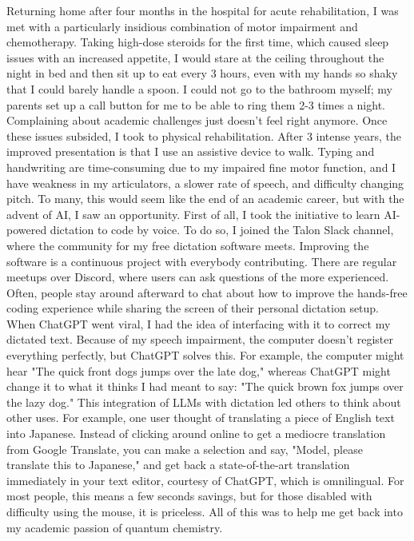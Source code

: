 \documentclass[11pt]{article} %
\begin{document}
Returning home after four months in the hospital for acute rehabilitation, I was met with a particularly insidious combination of motor impairment and chemotherapy. Taking high-dose steroids for the first time, which caused sleep issues with an increased appetite, I would stare at the ceiling throughout the night in bed and then sit up to eat every 3 hours, even with my hands so shaky that I could barely handle a spoon. I could not go to the bathroom myself; my parents set up a call button for me to be able to ring them 2-3 times a night. Complaining about academic challenges just doesn't feel right anymore. Once these issues subsided, I took to physical rehabilitation. After 3 intense years, the improved presentation is that I use an assistive device to walk. Typing and handwriting are time-consuming due to my impaired fine motor function, and I have weakness in my articulators, a slower rate of speech, and difficulty changing pitch. To many, this would seem like the end of an academic career, but with the advent of AI, I saw an opportunity. First of all, I took the initiative to learn AI-powered dictation to code by voice. To do so, I joined the Talon Slack channel, where the community for my free dictation software meets. Improving the software is a continuous project with everybody contributing. There are regular meetups over Discord, where users can ask questions of the more experienced. Often, people stay around afterward to chat about how to improve the hands-free coding experience while sharing the screen of their personal dictation setup. When ChatGPT went viral, I had the idea of interfacing with it to correct my dictated text. Because of my speech impairment, the computer doesn't register everything perfectly, but ChatGPT solves this. For example, the computer might hear "The quick front dogs jumps over the late dog," whereas ChatGPT might change it to what it thinks I had meant to say: "The quick brown fox jumps over the lazy dog." This integration of LLMs with dictation led others to think about other uses. For example, one user thought of translating a piece of English text into Japanese. Instead of clicking around online to get a mediocre translation from Google Translate, you can make a selection and say, "Model, please translate this to Japanese," and get back a state-of-the-art translation immediately in your text editor, courtesy of ChatGPT, which is omnilingual. For most people, this means a few seconds savings, but for those disabled with difficulty using the mouse, it is priceless. All of this was to help me get back into my academic passion of quantum chemistry.
\end{document}
